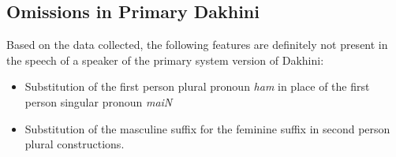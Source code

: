 \documentclass[a4paper]{article}
\begin{document}
\subsection{Omissions in Primary Dakhini}

Based on the data collected, the following features are definitely not present in the speech of a speaker of the primary system version of Dakhini:

\begin{itemize}
\item
Substitution of the first person plural pronoun \textit{ham} in place of the first person singular pronoun \textit{maiN}
\item
Substitution of the masculine suffix for the feminine suffix in second person plural constructions.
\end{itemize}
\end{document}
